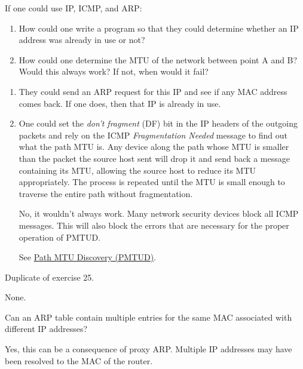 \begin{Exercise}
If one could use IP, ICMP, and ARP:
\begin{enumerate}
    \item How could one write a program so that they could determine whether an IP address was already in use or not?
    \item How could one determine the MTU of the network between point A and B?
    Would this always work? If not, when would it fail?
\end{enumerate}
\end{Exercise}
\begin{Answer}
\begin{enumerate}
    \item They could send an ARP request for this IP and see if any MAC address comes back.
    If one does, then that IP is already in use.
    \item One could set the \textit{don't fragment} (DF) bit in the IP headers of the outgoing packets and rely on the ICMP \textit{Fragmentation Needed} message to find out what the path MTU is. Any device along the path whose MTU is smaller than the packet the source host sent will drop it and send back a message containing its MTU, allowing the source host to reduce its MTU appropriately. The process is repeated until the MTU is small enough to traverse the entire path without fragmentation.

    No, it wouldn't always work. Many network security devices block all ICMP messages. This will also block the errors that are necessary for the proper operation of PMTUD.

    See \href{https://en.wikipedia.org/wiki/Path_MTU_Discovery}{Path MTU Discovery (PMTUD)}.
\end{enumerate}
\end{Answer}

\begin{Exercise}
Duplicate of exercise 25.
\end{Exercise}
\begin{Answer}
None.
\end{Answer}

\begin{Exercise}
Can an ARP table contain multiple entries for the same MAC associated with different IP addresses?
\end{Exercise}
\begin{Answer}
Yes, this can be a consequence of proxy ARP.
Multiple IP addresses may have been resolved to the MAC of the router.
\end{Answer}

